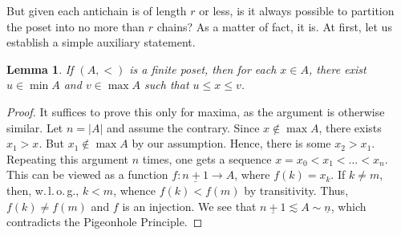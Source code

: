 \documentclass[12pt,notitlepage]{article}
\theoremstyle{plain}
\newtheorem{lemma}[thm]{Lemma}
\theoremstyle{definition}
\theoremstyle{plain}
\newcommand{\ul}[1]{\underline{#1}}
\newcommand{\1}{\mathbf{1}}
\newcommand{\0}{\mathbf{0}}
\begin{document}
But given each antichain is of length $r$ or less, is it always possible to partition the poset into no more than $r$ chains? As a matter of fact, it is. At first, let us establish a simple auxiliary statement.

\begin{lemma}\label{L13:fin_min}
If $(A, <)$ is a finite poset, then for each $x \in A$, there exist $u \in \min A$ and $v \in \max A$ such that $u \leq x \leq v$.
\end{lemma}
\begin{proof}
It suffices to prove this only for maxima, as the argument is otherwise similar. Let $n = |A|$ and assume the contrary. Since $x \notin \max A$, there exists $x_1 > x$. But $x_1 \notin \max A$ by our assumption. Hence, there is some $x_2 > x_1$. Repeating this argument $n$ times, one gets a sequence $x = x_0 < x_1 < \ldots < x_n$. This can be viewed as a function $f\colon \ul{n + 1} \to A$, where $f(k) = x_k$. If $k \neq m$, then, w.\,l.\,o.\,g., $k < m$, whence $f(k) < f(m)$ by transitivity. Thus, $f(k) \neq f(m)$ and $f$ is an injection. We see that $\ul{n + 1} \lesssim A \sim \ul{n}$, which contradicts the Pigeonhole Principle.
 \end{proof}
\end{document}
